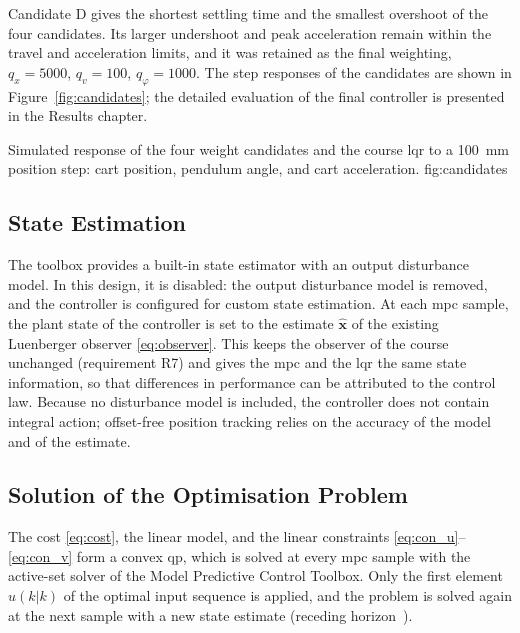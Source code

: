 Candidate D gives the shortest settling time and the smallest overshoot of the
four candidates. Its larger undershoot and peak acceleration remain within the
travel and acceleration limits, and it was retained as the final weighting,
$q_x = 5000$, $q_v = 100$, $q_\varphi = 1000$. The step responses of the
candidates are shown in Figure~\ref{fig:candidates}; the detailed evaluation of
the final controller is presented in the Results chapter.

  {Simulated response of the four weight candidates and the course \acs{lqr} to a 100~mm position step: cart position, pendulum angle, and cart acceleration.}
  {fig:candidates}

\subsection{State Estimation}
\label{subsec:estimation}

The toolbox provides a built-in state estimator with an output disturbance
model. In this design, it is disabled: the output disturbance model is
removed, and the controller is configured for custom state estimation. At each
\ac{mpc} sample, the plant state of the controller is set to the estimate
$\hat{\mathbf{x}}$ of the existing Luenberger observer \eqref{eq:observer}.
This keeps the observer of the course unchanged (requirement R7) and gives the
\ac{mpc} and the \ac{lqr} the same state information, so that differences in
performance can be attributed to the control law. Because no disturbance model
is included, the controller does not contain integral action; offset-free
position tracking relies on the accuracy of the model and of the estimate.

\subsection{Solution of the Optimisation Problem}
\label{subsec:qp}

The cost \eqref{eq:cost}, the linear model, and the linear constraints
\eqref{eq:con_u}--\eqref{eq:con_v} form a convex \ac{qp}, which is solved at
every \ac{mpc} sample with the active-set solver of the Model Predictive
Control Toolbox. Only the first element $u(k|k)$ of the optimal input sequence
is applied, and the problem is solved again at the next sample with a new
state estimate (receding horizon~\cite{rawlings2000}).

